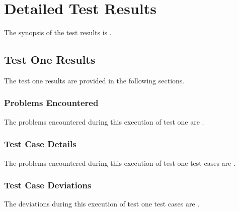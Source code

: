 
\chapter{Detailed Test Results}
\label{loc:DetailedTestResults}


The synopsis of the test results is \TBD.

\section{Test One Results}
\label{loc:TestOneResults}


The test one results are provided in the following sections.

\subsection{Problems Encountered}
\label{loc:TestOneResultsProblems}


The problems encountered during this execution of test one are \TBD.


\subsection{Test Case Details}
\label{loc:TestOneResultsProblems}


The problems encountered during this execution of test one test cases are \TBD.


\subsection{Test Case Deviations}
\label{loc:TestOneResultsProblems}


The deviations during this execution of test one test cases are \TBD.

